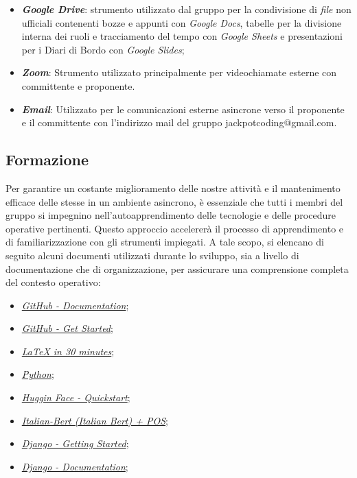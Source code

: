\documentclass[5pt]{article}
\begin{document}
\begin{itemize}
	\item \textbf{\textit{Google Drive}}: strumento utilizzato dal gruppo per la condivisione di \textit{file} non ufficiali contenenti bozze e appunti con \textit{Google Docs}, tabelle per la divisione interna dei ruoli e tracciamento del tempo con \textit{Google Sheets} e presentazioni per i Diari di Bordo con \textit{Google Slides};
	
	\item \textbf{\textit{Zoom}}: Strumento utilizzato principalmente per videochiamate esterne con committente e proponente.
	
	\item \textbf{\textit{Email}}: Utilizzato per le comunicazioni esterne asincrone verso il proponente e il committente con l'indirizzo mail del gruppo jackpotcoding@gmail.com.
\end{itemize}


\subsection{Formazione}
Per garantire un costante miglioramento delle nostre attività e il mantenimento efficace delle stesse in un ambiente asincrono, è essenziale che tutti i membri del gruppo si impegnino nell'autoapprendimento delle tecnologie e delle procedure operative pertinenti. 
Questo approccio accelererà il processo di apprendimento e di familiarizzazione con gli strumenti impiegati. A tale scopo, si elencano di seguito alcuni documenti utilizzati durante lo sviluppo, sia a livello di documentazione che di organizzazione, per assicurare una comprensione completa del contesto operativo:

\begin{itemize} 
    \item \href{https://docs.github.com/en}{\textit{GitHub - Documentation}};
    \item \href{https://docs.github.com/en/get-started/using-git/pushing-commits-to-a-remote-repository}{\textit{GitHub - Get Started}};
    \item \href{https://www.overleaf.com/learn/latex/Learn_LaTeX_in_30_minutes}{\textit{LaTeX in 30 minutes}};
    \item \href{https://docs.python.org/3/tutorial/index.html}{\textit{Python}};
    \item \href{https://huggingface.co/docs/datasets/quickstart}{\textit{Huggin Face - Quickstart}};
    \item \href{https://huggingface.co/sachaarbonel/bert-italian-cased-finetuned-pos}{\textit{Italian-Bert (Italian Bert) + POS}};
    \item \href{https://www.djangoproject.com/start/}{\textit{Django - Getting Started}};
    \item \href{https://docs.djangoproject.com/en/5.0/}{\textit{Django - Documentation}};
\end{itemize}
\end{document}

